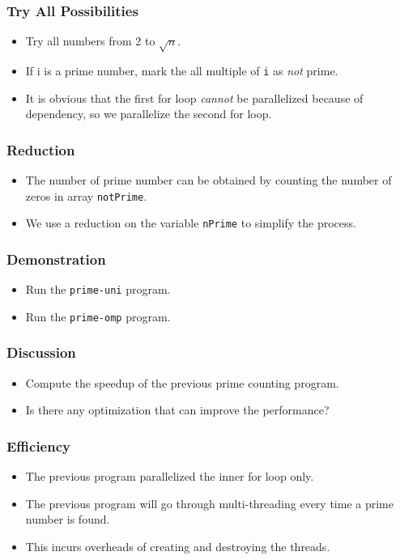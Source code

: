 \documentclass{beamer}
\begin{document}
\begin{frame}
\frametitle{Try All Possibilities}
\begin{itemize}
\item Try all numbers from 2 to $\sqrt{n}$.
\item If i is a prime number, mark the all multiple of {\tt i} as {\em
  not} prime.
\item It is obvious that the first for loop {\em cannot} be
  parallelized because of dependency, so we parallelize the second for
  loop.
\end{itemize}
\end{frame}

\begin{frame}
\frametitle{Reduction}
\begin{itemize}
\item The number of prime number can be obtained by counting the
  number of zeros in array {\tt notPrime}.
\item We use a reduction on the variable {\tt nPrime} to simplify the
  process.
\end{itemize}
\end{frame}

\begin{frame}
  \frametitle{Demonstration}
  \begin{itemize}
  \item Run the {\tt prime-uni} program.
  \item Run the {\tt prime-omp} program.
  \end{itemize}
\end{frame}

\begin{frame}
  \frametitle{Discussion}
  \begin{itemize}
  \item Compute the speedup of the previous prime counting program.
  \item Is there any optimization that can improve the performance?
  \end{itemize}
\end{frame}

\begin{frame}
\frametitle{Efficiency}
\begin{itemize}
\item The previous program parallelized the inner for loop only.
\item The previous program will go through multi-threading every time a
  prime number is found.
\item This incurs overheads of creating and destroying the threads.
\end{itemize}
\end{frame}
\end{document}
